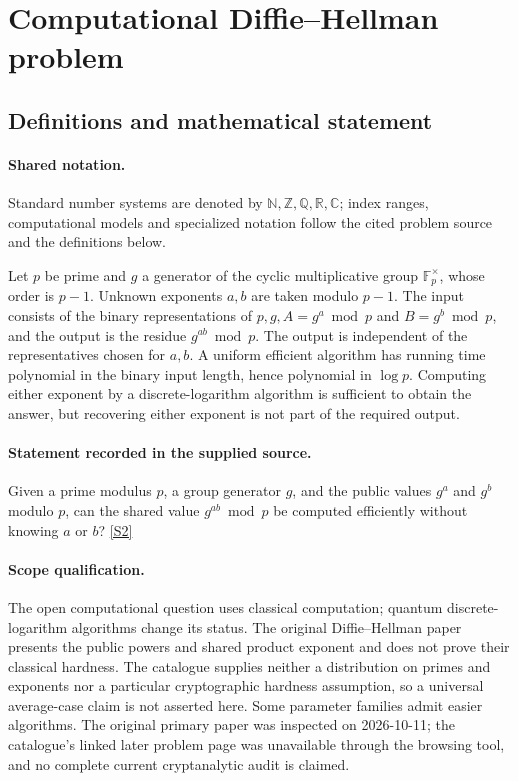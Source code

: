 \documentclass[11pt]{article}
\newcommand{\sref}[2]{\hyperlink{source:#1:#2}{[S#2]}}
\begin{document}
\section{Computational Diffie–Hellman problem}\label{statement}

\subsection{Definitions and mathematical statement}

\paragraph{Shared notation.}Standard number systems are denoted by $\mathbb N,\mathbb Z,\mathbb Q,\mathbb R,\mathbb C$; index ranges, computational models and specialized notation follow the cited problem source and the definitions below.


Let $p$ be prime and $g$ a generator of the cyclic multiplicative group $\mathbb{F}_p^{\times}$, whose order is $p-1$. Unknown exponents $a,b$ are taken modulo $p-1$. The input consists of the binary representations of $p,g,A=g^a\bmod p$ and $B=g^b\bmod p$, and the output is the residue $g^{ab}\bmod p$. The output is independent of the representatives chosen for $a,b$. A uniform efficient algorithm has running time polynomial in the binary input length, hence polynomial in $\log p$. Computing either exponent by a discrete-logarithm algorithm is sufficient to obtain the answer, but recovering either exponent is not part of the required output.
\paragraph{Statement recorded in the supplied source.}
Given a prime modulus $p$, a group generator $g$, and the public values $g^a$ and $g^b$ modulo $p$, can the shared value $g^{ab}\bmod p$ be computed efficiently without knowing $a$ or $b$? \sref{statement}{2}
\paragraph{Scope qualification.}
The open computational question uses classical computation; quantum discrete-logarithm algorithms change its status. The original Diffie--Hellman paper presents the public powers and shared product exponent and does not prove their classical hardness. The catalogue supplies neither a distribution on primes and exponents nor a particular cryptographic hardness assumption, so a universal average-case claim is not asserted here. Some parameter families admit easier algorithms. The original primary paper was inspected on 2026-10-11; the catalogue's linked later problem page was unavailable through the browsing tool, and no complete current cryptanalytic audit is claimed.
\end{document}
